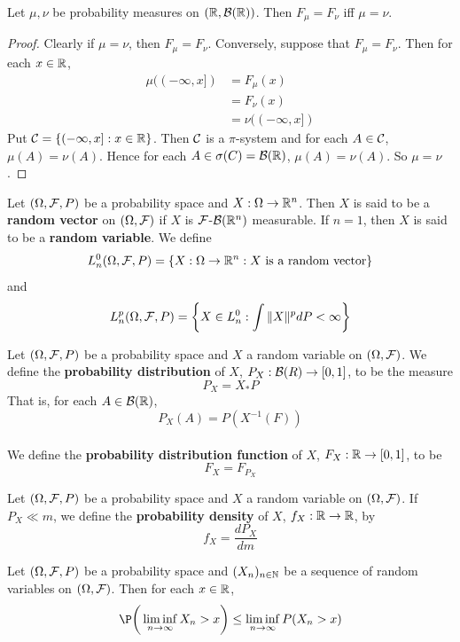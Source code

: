 \documentclass{book}
\begin{document}
	\begin{ex}
		Let $\mu, \nu$ be probability measures on $(\mathbb{R}, \mathcal{B}(\mathbb{R}))$. Then $F_{\mu} = F_{\nu}$ iff $\mu = \nu$.  
	\end{ex}
	
	\begin{proof}
		Clearly if $\mu = \nu$, then $F_{\mu} = F_{\nu}$. Conversely, suppose that $F_{\mu} = F_{\nu}$. Then for each $x \in \mathbb{R}$, 
		\begin{align*}
			\mu((-\infty,x]) 
			&= F_{\mu}(x) \\
			&= F_{\nu}(x)  \\
			&= \nu((-\infty,x])
		\end{align*}
		Put $\mathcal{C} = \{(-\infty,x]:x \in \mathbb{R}\} $. Then $\mathcal{C}$ is a $\pi$-system and for each $A \in \mathcal{C}$, $\mu(A) = \nu(A)$. Hence for each $A \in \sigma(C) = \mathcal{B}(\mathbb{R})$, $\mu(A) = \nu(A)$. So $\mu = \nu$. 
	\end{proof}
	
	\begin{defn}
		Let $(\Omega, \mathcal{F}, P)$ be a probability space and $X:\Omega \rightarrow \mathbb{R}^n$. Then $X$ is said to be a \textbf{random vector} on $(\Omega, \mathcal{F})$ if $X$ is $\mathcal{F}$-$\mathcal{B}(\mathbb{R}^n)$ measurable. If $n = 1$, then $X$ is said to be a \textbf{random variable}. We define $$L_n^0(\Omega, \mathcal{F}, P) = \{X:\Omega \rightarrow \mathbb{R}^n: X \text{ is a random vector}\}$$ and $$L_n^p(\Omega, \mathcal{F}, P) = \bigg \{X \in L_n^0: \int \|X\|^p dP < \infty \bigg \} $$ 
	\end{defn}
	
	\begin{defn}
		Let $(\Omega, \mathcal{F}, P)$ be a probability space and $X$ a random variable on $(\Omega,\mathcal{F})$. We define the \textbf{probability distribution} of $X$, $P_X:\mathcal{B}(R) \rightarrow [0,1]$, to be the measure $$P_X = X_*P$$ That is, for each $A \in \mathcal{B}(\mathbb{R})$, $$P_X(A) = P(X^{-1}(F))$$ \\ We define the \textbf{probability distribution function} of $X$, $F_X:\mathbb{R} \rightarrow [0,1]$, to be $$F_X = F_{P_X}$$
	\end{defn}
	
	\begin{defn}
		Let $(\Omega, \mathcal{F}, P)$ be a probability space and $X$ a random variable on $(\Omega,\mathcal{F})$. If $P_X \ll m$, we define the \textbf{probability density} of $X$, $f_X: \mathbb{R} \rightarrow \mathbb{R}$, by $$f_X = \frac{dP_X}{dm}$$ 
	\end{defn}
	
	\begin{ex}
		Let $(\Omega, \mathcal{F}, P)$ be a probability space and $(X_n)_{n \in \mathbb{N}}$ be a sequence of random variables on $(\Omega, \mathcal{F})$. Then for each $x \in \mathbb{R}$, $$\P\bigg(\liminf_{n \rightarrow \infty}X_n > x\bigg) \leq \liminf_{n \rightarrow \infty} P(X_n > x)$$  
	\end{ex}
	
\end{document}
